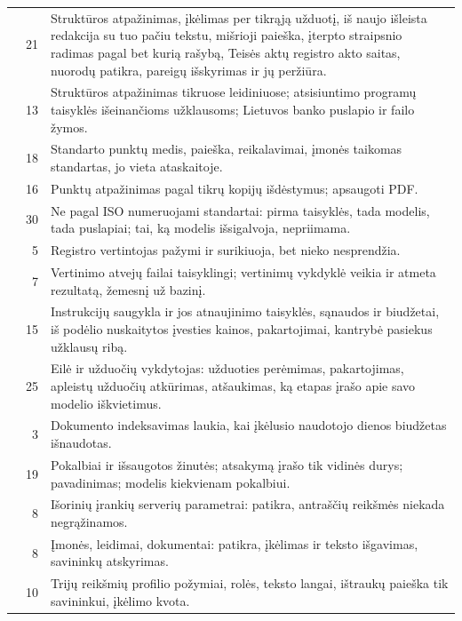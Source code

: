\begin{xltabular}{\textwidth}{@{}L{38mm}rY@{}}
 & 21 & Struktūros atpažinimas, įkėlimas per tikrąją užduotį, iš naujo išleista redakcija su tuo pačiu tekstu, mišrioji paieška, įterpto straipsnio radimas pagal bet kurią rašybą, Teisės aktų registro akto saitas, nuorodų patikra, pareigų išskyrimas ir jų peržiūra. \\
 & 13 & Struktūros atpažinimas tikruose leidiniuose; atsisiuntimo programų taisyklės išeinančioms užklausoms; Lietuvos banko puslapio ir failo žymos. \\
 & 18 & Standarto punktų medis, paieška, reikalavimai, įmonės taikomas standartas, jo vieta ataskaitoje. \\
 & 16 & Punktų atpažinimas pagal tikrų kopijų išdėstymus; apsaugoti PDF. \\
 & 30 & Ne pagal ISO numeruojami standartai: pirma taisyklės, tada modelis, tada puslapiai; tai, ką modelis išsigalvoja, nepriimama. \\
 & 5 & Registro vertintojas pažymi ir surikiuoja, bet nieko nesprendžia. \\
 & 7 & Vertinimo atvejų failai taisyklingi; vertinimų vykdyklė veikia ir atmeta rezultatą, žemesnį už bazinį. \\
 & 15 & Instrukcijų saugykla ir jos atnaujinimo taisyklės, sąnaudos ir biudžetai, iš podėlio nuskaitytos įvesties kainos, pakartojimai, kantrybė pasiekus užklausų ribą. \\
 & 25 & Eilė ir užduočių vykdytojas: užduoties perėmimas, pakartojimas, apleistų užduočių atkūrimas, atšaukimas, ką etapas įrašo apie savo modelio iškvietimus. \\
 & 3 & Dokumento indeksavimas laukia, kai įkėlusio naudotojo dienos biudžetas išnaudotas. \\
 & 19 & Pokalbiai ir išsaugotos žinutės; atsakymą įrašo tik vidinės durys; pavadinimas; modelis kiekvienam pokalbiui. \\
 & 8 & Išorinių įrankių serverių parametrai: patikra, antraščių reikšmės niekada negrąžinamos. \\
 & 8 & Įmonės, leidimai, dokumentai: patikra, įkėlimas ir teksto išgavimas, savininkų atskyrimas. \\
 & 10 & Trijų reikšmių profilio požymiai, rolės, teksto langai, ištraukų paieška tik savininkui, įkėlimo kvota. \\

\end{xltabular}

